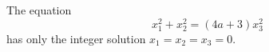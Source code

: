 \begin{proposition}
    The equation
\[
    x_1^2+x_2^2=(4a+3)x_3^2
\]
    has only the integer solution $x_1=x_2=x_3=0$.
\end{proposition}
